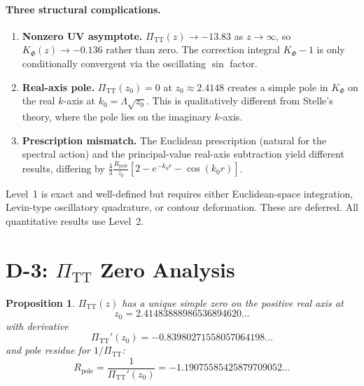 \documentclass[11pt,a4paper]{article}
\newcommand{\PiTT}{\Pi_{\mathrm{TT}}}
\newcommand{\KPhi}{K_\Phi}
\newtheorem{proposition}[theorem]{Proposition}
\begin{document}
\paragraph{Three structural complications.}
\begin{enumerate}
  \item \textbf{Nonzero UV asymptote.}  $\PiTT(z) \to -13.83$ as
    $z \to \infty$, so $\KPhi(z) \to -0.136$ rather than zero.  The
    correction integral $\KPhi - 1$ is only conditionally convergent via
    the oscillating $\sin$ factor.

  \item \textbf{Real-axis pole.}  $\PiTT(z_0) = 0$ at
    $z_0 \approx 2.4148$ creates a simple pole in $\KPhi$ on the real
    $k$-axis at $k_0 = \Lambda\sqrt{z_0}$.  This is qualitatively
    different from Stelle's theory, where the pole lies on the imaginary
    $k$-axis.

  \item \textbf{Prescription mismatch.}  The Euclidean prescription
    (natural for the spectral action) and the principal-value real-axis
    subtraction yield different results, differing by
    $\tfrac{4}{3}\tfrac{R_\mathrm{pole}}{z_0}[2 - e^{-k_0 r} - \cos(k_0 r)]$.
\end{enumerate}

\noindent Level~1 is exact and well-defined but requires either Euclidean-space
integration, Levin-type oscillatory quadrature, or contour deformation.
These are deferred.  All quantitative results use Level~2.


\section{D-3: $\PiTT$ Zero Analysis}
\label{sec:zero}

\begin{proposition}\label{prop:zero}
$\PiTT(z)$ has a unique simple zero on the positive real axis at
\begin{equation}\label{eq:z0}
  z_0 = 2.41483888986536894620\ldots
\end{equation}
with derivative
\begin{equation}
  \PiTT'(z_0) = -0.83980271558057064198\ldots
\end{equation}
and pole residue for $1/\PiTT$:
\begin{equation}
  R_{\mathrm{pole}} = \frac{1}{\PiTT'(z_0)} = -1.19075585425879709052\ldots
\end{equation}
\end{proposition}
\end{document}

